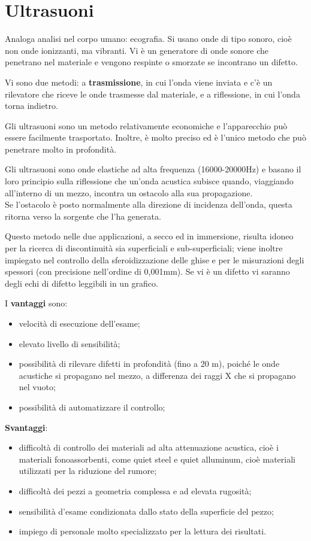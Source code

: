 \section{Ultrasuoni}

Analoga analisi nel corpo umano: ecografia.
Si usano onde di tipo sonoro, cioè non onde ionizzanti, ma vibranti. Vi è un generatore di onde sonore che penetrano nel materiale e vengono respinte o smorzate se incontrano un difetto.

Vi sono due metodi: a \textbf{trasmissione}, in cui l’onda viene inviata e c’è un rilevatore che riceve le onde trasmesse dal materiale, e a riflessione, in cui l’onda torna indietro.

Gli ultrasuoni sono un metodo relativamente economiche e l’apparecchio può essere facilmente trasportato. Inoltre, è molto preciso ed è l’unico metodo che può penetrare molto in profondità.

Gli ultrasuoni sono onde elastiche ad alta frequenza (16000-20000Hz) e basano il loro principio sulla riflessione che un’onda acustica subisce quando, viaggiando all’interno di un mezzo, incontra un ostacolo alla sua propagazione.\\
Se l’ostacolo è posto normalmente alla direzione di incidenza dell’onda, questa ritorna verso la sorgente che l’ha generata.

Questo metodo nelle due applicazioni, a secco ed in immersione, risulta idoneo per la ricerca di discontinuità sia superficiali e sub-superficiali; viene inoltre impiegato nel controllo della sferoidizzazione delle ghise e per le misurazioni degli spessori (con precisione nell’ordine di 0,001mm). Se vi è un difetto vi saranno degli echi di difetto leggibili in un grafico.

I \textbf{vantaggi} sono:
\begin{itemize}
    \item velocità di esecuzione dell'esame;
    \item elevato livello di sensibilità;
    \item possibilità di rilevare difetti in profondità (fino a 20 m), poiché le onde acustiche si propagano nel mezzo, a differenza dei raggi X che si propagano nel vuoto;
    \item possibilità di automatizzare il controllo;
\end{itemize}

\textbf{Svantaggi}:
\begin{itemize}
    \item difficoltà di controllo dei materiali ad alta attenuazione acustica, cioè i materiali fonoassorbenti, come quiet steel e quiet alluminum, cioè materiali utilizzati per la riduzione del rumore;
    \item difficoltà dei pezzi a geometria complessa e ad elevata rugosità;
    \item sensibilità d’esame condizionata dallo stato della superficie del pezzo;
    \item impiego di personale molto specializzato per la lettura dei risultati.
\end{itemize}


